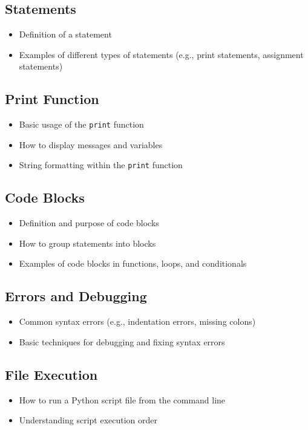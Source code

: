 \subsection{Statements}
\begin{itemize}
    \item Definition of a statement
    \item Examples of different types of statements (e.g., print statements, assignment statements)
\end{itemize}

\subsection{Print Function}
\begin{itemize}
    \item Basic usage of the \texttt{print} function
    \item How to display messages and variables
    \item String formatting within the \texttt{print} function
\end{itemize}

\subsection{Code Blocks}
\begin{itemize}
    \item Definition and purpose of code blocks
    \item How to group statements into blocks
    \item Examples of code blocks in functions, loops, and conditionals
\end{itemize}

\subsection{Errors and Debugging}
\begin{itemize}
    \item Common syntax errors (e.g., indentation errors, missing colons)
    \item Basic techniques for debugging and fixing syntax errors
\end{itemize}

\subsection{File Execution}
\begin{itemize}
    \item How to run a Python script file from the command line
    \item Understanding script execution order
\end{itemize}

